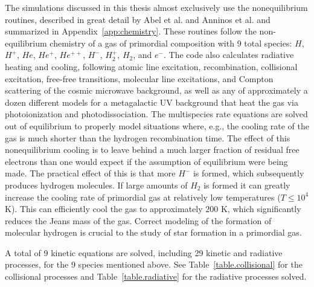 The simulations discussed in this thesis almost exclusively use the nonequilibrium
routines, described in great detail by Abel et al. and Anninos et al.  
\citep{abel97,anninos97} and summarized in Appendix~\ref{app:chemistry}. These 
routines follow the non-equilibrium chemistry of a 
gas of primordial composition with 9 total species:  
$H$, $H^+$, $He$, $He^+$, $He^{++}$, $H^-$, $H_2^+$, $H_2$, and $e^-$.  The code also calculates 
radiative heating and cooling, following atomic line excitation, recombination,
collisional excitation, free-free transitions, molecular line excitations, and Compton
scattering of the cosmic microwave background, as well as any of
approximately a dozen different models for a metagalactic UV background that heat
the gas via photoionization and photodissociation. 
The multispecies rate equations are solved out of
equilibrium to properly model situations where, e.g., the cooling rate of the gas
is much shorter than the hydrogen recombination time.  The effect of this nonequilibrium
cooling is to leave behind a much larger fraction of residual free electrons than one would
expect if the assumption of equilibrium were being made.  The practical effect of this
is that more $H^-$ is formed, which subsequently produces hydrogen molecules.  If large
amounts of $H_2$ is formed it can greatly increase the cooling rate of primordial gas
at relatively low temperatures ($T \leq 10^4$ K).  This can efficiently cool the gas 
to approximately $200$ K, which significantly reduces the Jeans mass of the gas.  Correct
modeling of the formation of molecular hydrogen is crucial to the study of star formation
in a primordial gas.

A total of 9 kinetic equations are solved, including 29 kinetic and radiative 
processes, for the 9 species mentioned above.  See Table~\ref{table.collisional} 
for the collisional processes and Table~\ref{table.radiative} for the 
radiative processes solved.


